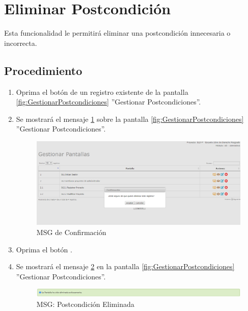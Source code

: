 \hypertarget{cv:eliminarPostcondicion}{\section{Eliminar Postcondición}} \label{sec:eliminarPostcondicion}

	Esta funcionalidad le permitirá eliminar una postcondición innecesaria o incorrecta. 

		\subsection{Procedimiento}

			\begin{enumerate}
	
			\item Oprima el botón \IUBotonEliminar{} de un registro existente de la pantalla \ref{fig:GestionarPostcondiciones} ''Gestionar Postcondiciones''.
	
			\item Se mostrará el mensaje \ref{fig:confirmaEliminaPost} sobre la pantalla \ref{fig:GestionarPostcondiciones} ''Gestionar Postcondiciones''.
			
			\begin{figure}[htbp!]
				\begin{center}
					\includegraphics[scale=0.5]{roles/lider/casosUso/pantallas/IU11-3MSG10}
					\caption{MSG de Confirmación}
					\label{fig:confirmaEliminaPost}
				\end{center}
			\end{figure}
						
			\item Oprima el botón \IUAceptar.
			
			\item Se mostrará el mensaje \ref{fig:PostEliminada} en la pantalla \ref{fig:GestionarPostcondiciones} ''Gestionar Postcondiciones''.
			
			\begin{figure}[htbp!]
				\begin{center}
					\includegraphics[scale=0.5]{roles/lider/pantallas/pantallas/IU11-3MSG1}
					\caption{MSG: Postcondición Eliminada}
					\label{fig:PostEliminada}
				\end{center}
			\end{figure}
			\end{enumerate}